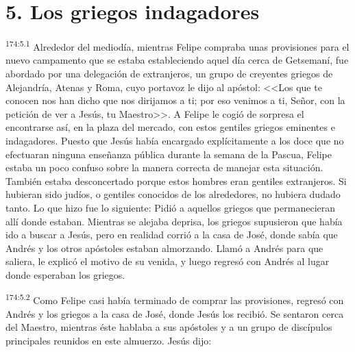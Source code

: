 \section*{5. Los griegos indagadores}
\par 
\textsuperscript{174:5.1} Alrededor del mediodía, mientras Felipe compraba unas provisiones para el nuevo campamento que se estaba estableciendo aquel día cerca de Getsemaní, fue abordado por una delegación de extranjeros, un grupo de creyentes griegos de Alejandría, Atenas y Roma, cuyo portavoz le dijo al apóstol: <<Los que te conocen nos han dicho que nos dirijamos a ti; por eso venimos a ti, Señor, con la petición de ver a Jesús, tu Maestro>>. A Felipe le cogió de sorpresa el encontrarse así, en la plaza del mercado, con estos gentiles griegos eminentes e indagadores. Puesto que Jesús había encargado explícitamente a los doce que no efectuaran ninguna enseñanza pública durante la semana de la Pascua, Felipe estaba un poco confuso sobre la manera correcta de manejar esta situación. También estaba desconcertado porque estos hombres eran gentiles extranjeros. Si hubieran sido judíos, o gentiles conocidos de los alrededores, no hubiera dudado tanto. Lo que hizo fue lo siguiente: Pidió a aquellos griegos que permanecieran allí donde estaban. Mientras se alejaba deprisa, los griegos supusieron que había ido a buscar a Jesús, pero en realidad corrió a la casa de José, donde sabía que Andrés y los otros apóstoles estaban almorzando. Llamó a Andrés para que saliera, le explicó el motivo de su venida, y luego regresó con Andrés al lugar donde esperaban los griegos.

\par 
\textsuperscript{174:5.2} Como Felipe casi había terminado de comprar las provisiones, regresó con Andrés y los griegos a la casa de José, donde Jesús los recibió. Se sentaron cerca del Maestro, mientras éste hablaba a sus apóstoles y a un grupo de discípulos principales reunidos en este almuerzo. Jesús dijo:

